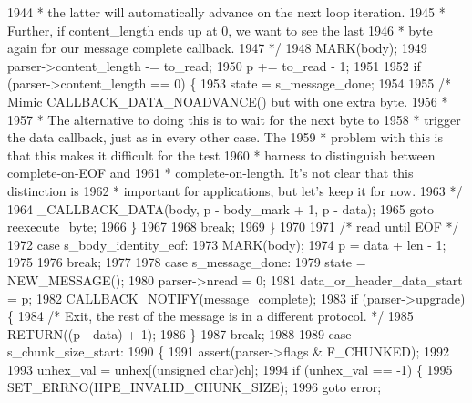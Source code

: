 \begin{DoxyCode}
1944 \textcolor{comment}{         * the latter will automatically advance on the next loop iteration.}
1945 \textcolor{comment}{         * Further, if content\_length ends up at 0, we want to see the last}
1946 \textcolor{comment}{         * byte again for our message complete callback.}
1947 \textcolor{comment}{         */}
1948         MARK(body);
1949         parser->content_length -= to\_read;
1950         p += to\_read - 1;
1951 
1952         \textcolor{keywordflow}{if} (parser->content_length == 0) \{
1953           state = s_message_done;
1954 
1955           \textcolor{comment}{/* Mimic CALLBACK\_DATA\_NOADVANCE() but with one extra byte.}
1956 \textcolor{comment}{           *}
1957 \textcolor{comment}{           * The alternative to doing this is to wait for the next byte to}
1958 \textcolor{comment}{           * trigger the data callback, just as in every other case. The}
1959 \textcolor{comment}{           * problem with this is that this makes it difficult for the test}
1960 \textcolor{comment}{           * harness to distinguish between complete-on-EOF and}
1961 \textcolor{comment}{           * complete-on-length. It's not clear that this distinction is}
1962 \textcolor{comment}{           * important for applications, but let's keep it for now.}
1963 \textcolor{comment}{           */}
1964           _CALLBACK_DATA(body, p - body\_mark + 1, p - data);
1965           \textcolor{keywordflow}{goto} reexecute\_byte;
1966         \}
1967 
1968         \textcolor{keywordflow}{break};
1969       \}
1970 
1971       \textcolor{comment}{/* read until EOF */}
1972       \textcolor{keywordflow}{case} s_body_identity_eof:
1973         MARK(body);
1974         p = data + len - 1;
1975 
1976         \textcolor{keywordflow}{break};
1977 
1978       \textcolor{keywordflow}{case} s_message_done:
1979         state = NEW_MESSAGE();
1980         parser->nread = 0;
1981         data\_or\_header\_data\_start = p;
1982         CALLBACK_NOTIFY(message\_complete);
1983         \textcolor{keywordflow}{if} (parser->upgrade) \{
1984           \textcolor{comment}{/* Exit, the rest of the message is in a different protocol. */}
1985           RETURN((p - data) + 1);
1986         \}
1987         \textcolor{keywordflow}{break};
1988 
1989       \textcolor{keywordflow}{case} s_chunk_size_start:
1990       \{
1991         assert(parser->flags & F_CHUNKED);
1992 
1993         unhex\_val = unhex[(\textcolor{keywordtype}{unsigned} char)ch];
1994         \textcolor{keywordflow}{if} (unhex\_val == -1) \{
1995           SET_ERRNO(HPE_INVALID_CHUNK_SIZE);
1996           \textcolor{keywordflow}{goto} error;

\end{DoxyCode}
